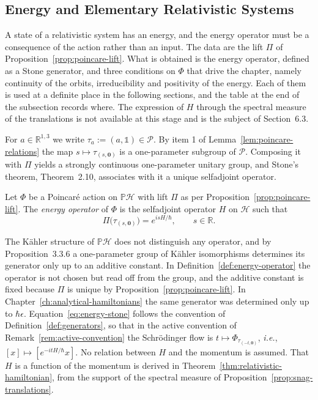 \subsection{Energy and Elementary Relativistic Systems}

A state of a relativistic system has an energy, and the energy operator must be a consequence of the action rather than an input. The data are the lift $\Pi$ of Proposition~\ref{prop:poincare-lift}. What is obtained is the energy operator, defined as a Stone generator, and three conditions on $\Phi$ that drive the chapter, namely continuity of the orbits, irreducibility and positivity of the energy. Each of them is used at a definite place in the following sections, and the table at the end of the subsection records where. The expression of $H$ through the spectral measure of the translations is not available at this stage and is the subject of Section~6.3.

For $a\in\mathbb{R}^{1,3}$ we write $\tau_a:=(a,\mathbb{1})\in\mathcal{P}$. By item 1 of Lemma~\ref{lem:poincare-relations} the map $s\mapsto\tau_{(s,\mathbf{0})}$ is a one-parameter subgroup of $\mathcal{P}$. Composing it with $\Pi$ yields a strongly continuous one-parameter unitary group, and Stone's theorem, Theorem~2.10, associates with it a unique selfadjoint operator.

\begin{definition}\label{def:energy-operator}
	Let $\Phi$ be a Poincar\'e action on $\mathbb{P}\mathcal{H}$ with lift $\Pi$ as per Proposition~\ref{prop:poincare-lift}. The \emph{energy operator} of $\Phi$ is the selfadjoint operator $H$ on $\mathcal{H}$ such that
	\begin{equation}\label{eq:energy-stone}
		\Pi\big(\tau_{(s,\mathbf{0})}\big)=e^{isH/\hbar},\qquad s\in\mathbb{R}.
	\end{equation}
\end{definition}

\begin{remark}
	The Kähler structure of $\mathbb{P}\mathcal{H}$ does not distinguish any operator, and by Proposition~3.3.6 a one-parameter group of Kähler isomorphisms determines its generator only up to an additive constant. In Definition~\ref{def:energy-operator} the operator is not chosen but read off from the group, and the additive constant is fixed because $\Pi$ is unique by Proposition~\ref{prop:poincare-lift}. In Chapter~\ref{ch:analytical-hamiltonians} the same generator was determined only up to $\hbar\epsilon$. Equation~\eqref{eq:energy-stone} follows the convention of Definition~\ref{def:generators}, so that in the active convention of Remark~\ref{rem:active-convention} the Schr\"odinger flow is $t\mapsto\Phi_{\tau_{(-t,\mathbf{0})}}$, \textit{i.e.}, $[x]\mapsto[e^{-itH/\hbar}x]$. No relation between $H$ and the momentum is assumed. That $H$ is a function of the momentum is derived in Theorem~\ref{thm:relativistic-hamiltonian}, from the support of the spectral measure of Proposition~\ref{prop:snag-translations}.
\end{remark}

